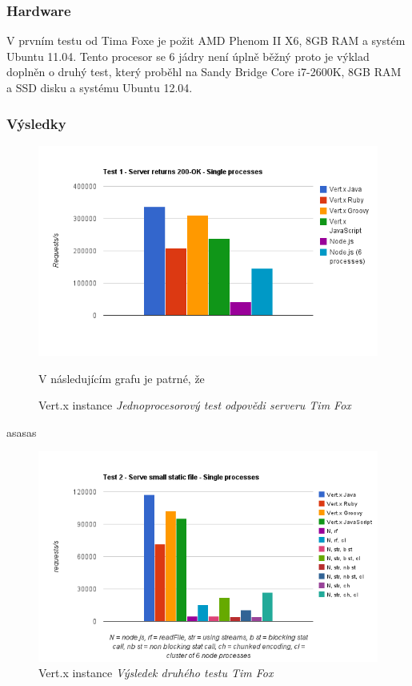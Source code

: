 \subsubsection{Hardware}

V prvním testu od Tima Foxe je požit  AMD Phenom II X6, 8GB RAM a systém Ubuntu 11.04. Tento procesor se 6 jádry není úplně běžný proto je výklad doplněn o druhý test, který proběhl na Sandy Bridge Core i7-2600K, 8GB RAM a SSD disku a systému Ubuntu 12.04.

\subsubsection{Výsledky}
\begin{figure}
\begin{centering}
\includegraphics[scale=0.7]{obrazky/chart_1}
\par\end{centering}
\caption{Vert.x instance \emph{Jednoprocesorový test odpovědi serveru Tim Fox} \label{fig:test1}}

V následujícím grafu je patrné, že

\end{figure}

asasas

\begin{figure}
\begin{centering}
\includegraphics[scale=0.7]{obrazky/chart_3-5}
\par\end{centering}
\caption{Vert.x instance \emph{Výsledek druhého testu Tim Fox} \label{fig:test2}}
\end{figure}

